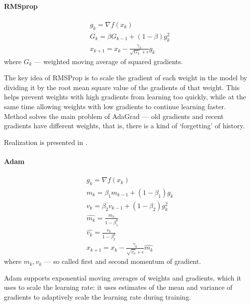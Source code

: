 \documentclass{article}
\begin{document}
\paragraph{RMSprop}
\begin{align*}
   & g_k =  \nabla f(x_k)                                       \\
   & G_k = \beta G_{k-1} + (1-\beta) g_k^2                      \\
   & x_{k+1} = x_k - \frac{\gamma_k}{\sqrt{G_k} + \epsilon} g_k
\end{align*}
where $G_k$ --- weighted moving average of squared gradients.

The key idea of RMSProp is to scale the gradient of each weight in the model by dividing it by the root mean square value of the gradients of that weight. This helps prevent weights with high gradients from learning too quickly, while at the same time allowing weights with low gradients to continue learning faster. Method solves the main problem of AdaGrad --- old gradients and recent gradients have different weights, that is, there is a kind of `forgetting' of history.

Realization is presented in .


\paragraph{Adam}
\begin{align*}
   & g_k =  \nabla f(x_k)                                                   \\
   & m_k = \beta_1 m_{k-1} + (1-\beta_1) g_k                                \\
   & v_k = \beta_2 v_{k-1} + (1-\beta_2) g_k^2                              \\
   & \hat{m_k} = \frac{m_k}{1-\beta_1^k}                                    \\
   & \hat{v_k} = \frac{v_k}{1-\beta_2^k}                                    \\
   & x_{k+1} = x_k - \frac{\gamma_k}{\sqrt{\hat{v_k}} + \epsilon} \hat{m_k}
\end{align*}
where $m_k, v_k$ --- so called first and second momentum of gradient.

Adam supports exponential moving averages of weights and gradients, which it uses to scale the learning rate: it uses estimates of the mean and variance of gradients to adaptively scale the learning rate during training.
\end{document}
